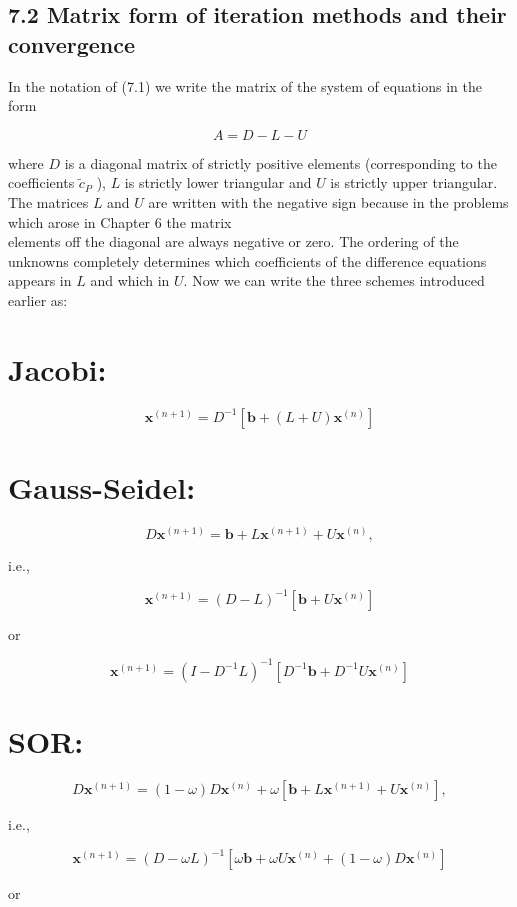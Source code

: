 \documentclass[10pt]{article}
\begin{document}
\subsection*{7.2 Matrix form of iteration methods and their convergence}
In the notation of (7.1) we write the matrix of the system of equations in the form

\[
A=D-L-U
\]

where \(D\) is a diagonal matrix of strictly positive elements (corresponding to the coefficients \(\tilde{c}_{P}\) ), \(L\) is strictly lower triangular and \(U\) is strictly upper triangular. The matrices \(L\) and \(U\) are written with the negative sign because in the problems which arose in Chapter 6 the matrix\\
elements off the diagonal are always negative or zero. The ordering of the unknowns completely determines which coefficients of the difference equations appears in \(L\) and which in \(U\). Now we can write the three schemes introduced earlier as:

\section*{Jacobi:}
\[
\mathbf{x}^{(n+1)}=D^{-1}\left[\mathbf{b}+(L+U) \mathbf{x}^{(n)}\right]
\]

\section*{Gauss-Seidel:}
\[
D \mathbf{x}^{(n+1)}=\mathbf{b}+L \mathbf{x}^{(n+1)}+U \mathbf{x}^{(n)},
\]

i.e.,

\[
\mathbf{x}^{(n+1)}=(D-L)^{-1}\left[\mathbf{b}+U \mathbf{x}^{(n)}\right]
\]

or

\[
\mathbf{x}^{(n+1)}=\left(I-D^{-1} L\right)^{-1}\left[D^{-1} \mathbf{b}+D^{-1} U \mathbf{x}^{(n)}\right]
\]

\section*{SOR:}
\[
D \mathbf{x}^{(n+1)}=(1-\omega) D \mathbf{x}^{(n)}+\omega\left[\mathbf{b}+L \mathbf{x}^{(n+1)}+U \mathbf{x}^{(n)}\right],
\]

i.e.,

\[
\mathbf{x}^{(n+1)}=(D-\omega L)^{-1}\left[\omega \mathbf{b}+\omega U \mathbf{x}^{(n)}+(1-\omega) D \mathbf{x}^{(n)}\right]
\]

or
\end{document}
